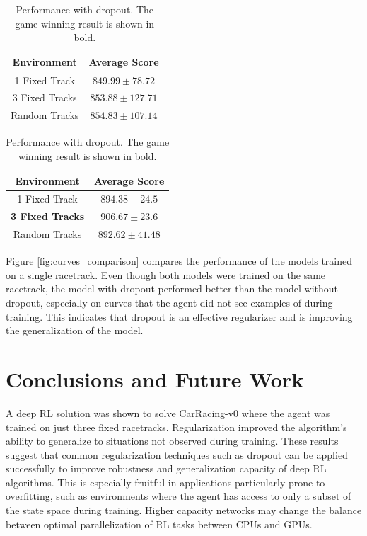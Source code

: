 \documentclass{article}
\begin{document}
\begin{table}[h!]
\begin{center}
\begin{minipage}[t]{.4\textwidth}
  \begin{tabular}{c|c}
    \textbf{Environment} & \textbf{Average Score}\\ \hline
    1 Fixed Track & $849.99\pm78.72$ \\
    3 Fixed Tracks & $853.88\pm127.71$ \\
    Random Tracks & $854.83\pm107.14$ \\
  \end{tabular}
  \caption{Performance without dropout}
  \label{tab:base_scores}
\end{minipage}
\hspace{1cm}
\begin{minipage}[t]{.4\textwidth}
  \begin{tabular}{c|c}
    \textbf{Environment} & \textbf{Average Score}\\
    \hline
    1 Fixed Track & $894.38\pm24.5$ \\
    \bf{3 Fixed Tracks} & \bf{$906.67\pm23.6$} \\
    Random Tracks & $892.62\pm41.48$ \\
  \end{tabular}
  \caption{Performance with dropout. The game winning result is shown
    in bold. }
  \label{tab:drop_scores}
\end{minipage}
\end{center}
\vspace{-5mm}
\end{table}

Figure \ref{fig:curves_comparison} compares the performance of the
models trained on a single racetrack. Even though both models were
trained on the same racetrack, the model with dropout performed better
than the model without dropout, especially on curves that the agent
did not see examples of during training. This indicates that 
dropout is an effective regularizer and is improving the
generalization of the model. 

\section{Conclusions and Future Work}
A deep RL solution was shown to solve CarRacing-v0 where the agent was
trained on just three fixed racetracks. 
Regularization improved the algorithm's ability to generalize to
situations not observed during training. These results suggest
that common regularization techniques such as dropout can be
applied successfully to improve robustness and generalization capacity
of deep RL algorithms. This is especially fruitful in applications
particularly prone to overfitting, such as environments where the
agent has access to only a subset of the state space during training.
Higher capacity networks may change the balance between optimal
parallelization of RL tasks between CPUs and GPUs\cite{stooke2018accelerated}. 
\end{document}
